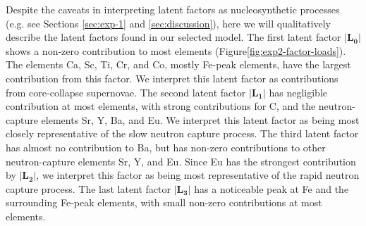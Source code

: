 \documentclass[twocolumn]{aastex62}
\newcommand{\todo}[1]{\textcolor{red}{#1}}
\begin{document}

Despite the caveats in interpreting latent factors as nucleosynthetic processes
(e.g. see Sections \ref{sec:exp-1} and \ref{sec:discussion}), here we will
qualitatively describe the latent factors found in our selected model.
The first latent factor $|\mathbf{L_0}|$ shows a non-zero contribution to most
elements (Figure\ref{fig:exp2-factor-loads}). The elements Ca, Sc, Ti, Cr, and Co, mostly
Fe-peak elements, have the largest contribution from this factor. We interpret this latent
factor as contributions from core-collapse supernovae.
The second latent factor $|\mathbf{L_1}|$ has negligible contribution at most elements,
with strong contributions for C, and the neutron-capture elements Sr, Y, Ba, and Eu. We
interpret this latent factor as being most closely representative of the slow neutron
capture process. The third latent factor has almost no contribution to Ba, but has
non-zero contributions to other neutron-capture elements Sr, Y, and Eu. Since Eu has
the strongest contribution by $|\mathbf{L_2}|$, we interpret this factor as being most
representative of the rapid neutron capture process. The last latent factor $|\mathbf{L_3}|$
has a noticeable peak at Fe and the surrounding Fe-peak elements, with small non-zero contributions
at most elements. 

\end{document}
